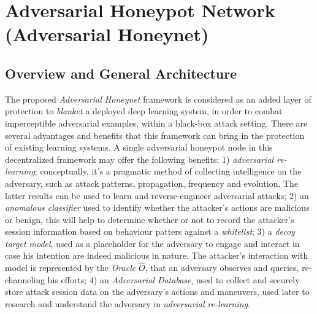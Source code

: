 \documentclass[grad,lot,lof,11pt,oneside,onehalfspace]{RUthesis}
\begin{document}
\section{Adversarial Honeypot Network (Adversarial Honeynet)}
\subsection{Overview and General Architecture}
The proposed \textit{Adversarial Honeynet} framework is considered as an added layer of protection to \textit{blanket} a deployed deep learning system,  in order to combat imperceptible adversarial examples, within a black-box attack setting. There are several advantages and benefits that this framework can bring in the protection of existing learning systems. A single adversarial honeypot node in this decentralized framework may offer the following benefits: 1) \textit{adversarial re-learning}; conceptually, it's a  pragmatic method of collecting intelligence on the adversary, such as attack patterns, propagation, frequency  and evolution. The latter results can be used to learn and reverse-engineer adversarial attacks; 2) an \textit{anomalous classifier} used to identify whether the attacker’s actions are malicious or benign, this will help to determine whether or not to record the attacker's session information based on behaviour patters against a \textit{whitelist}; 3) a \textit{decoy target model}, used as a placeholder for the adversary to engage and interact in case his intention are indeed malicious in nature. The attacker's interaction with model is represented by the \textit{Oracle} \textit{$\hat{O}$}, that an adversary observes and queries, re-channeling his efforts; 4) an \textit{Adversarial Database}, used to collect and securely store attack session data on the adversary’s actions and maneuvers, used later to research and understand the adversary in \textit{adversarial re-learning}.
\end{document}
